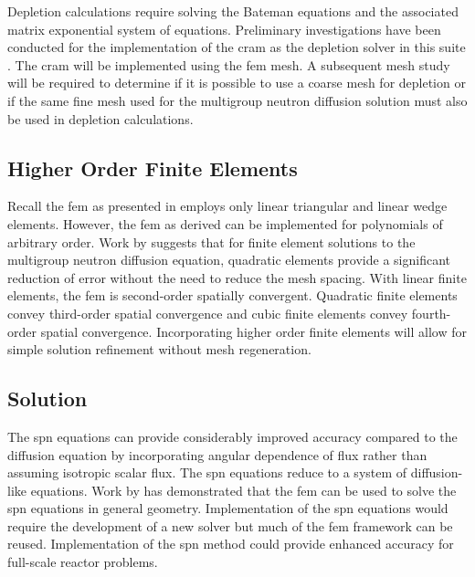     Depletion calculations require solving the Bateman equations and the
    associated matrix exponential system of equations. Preliminary
    investigations have been conducted for the implementation of the \gls{cram}
    as the depletion solver in this suite \cite{cram}. The \gls{cram} will be 
    implemented using the \gls{fem} mesh. A subsequent mesh study will be
    required to determine if it is possible to use a coarse mesh for depletion
    or if the same fine mesh used for the multigroup neutron diffusion solution
    must also be used in depletion calculations.

  \subsection{Higher Order Finite Elements}
    Recall the \gls{fem} as presented in  employs
    only linear triangular and linear wedge elements. However, the \gls{fem} as 
    derived can be implemented for polynomials of arbitrary order. Work by 
    \textcite{Hosseini2013} suggests that for finite element solutions to 
    the multigroup neutron diffusion equation, quadratic elements provide a 
    significant reduction of error without the need to reduce the mesh spacing. 
    With linear finite elements, the \gls{fem} is second-order spatially 
    convergent. Quadratic finite elements convey third-order spatial convergence 
    and cubic finite elements convey fourth-order spatial convergence. 
    Incorporating higher order finite elements will allow for simple solution 
    refinement without mesh regeneration.

  \subsection{\texorpdfstring{}{Simplified PN} Solution}
    The \gls{spn} equations can provide considerably improved accuracy compared
    to the diffusion equation by incorporating angular dependence of flux rather
    than assuming isotropic scalar flux. The \gls{spn} equations reduce to a
    system of diffusion-like equations. Work by \textcite{Ryu2013} has
    demonstrated that the \gls{fem} can be used to solve the \gls{spn} equations 
    in general geometry. Implementation of the \gls{spn} equations would
    require the development of a new solver but much of the \gls{fem} framework
    can be reused. Implementation of the \gls{spn} method could provide enhanced
    accuracy for full-scale reactor problems.


